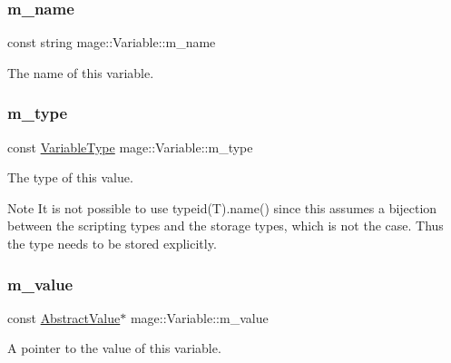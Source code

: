 \subsubsection{\texorpdfstring{m\+\_\+name}{m\_name}}
{\footnotesize\ttfamily const string mage\+::\+Variable\+::m\+\_\+name\hspace{0.3cm}{\ttfamily [private]}}

The name of this variable. \hypertarget{structmage_1_1_variable_acb45a61a0690e0efac614915595c4449}{}\label{structmage_1_1_variable_acb45a61a0690e0efac614915595c4449} 
\subsubsection{\texorpdfstring{m\+\_\+type}{m\_type}}
{\footnotesize\ttfamily const \hyperlink{namespacemage_a530428e73bac0ba7fe84b29086a9e33a}{Variable\+Type} mage\+::\+Variable\+::m\+\_\+type\hspace{0.3cm}{\ttfamily [private]}}

The type of this value.

\begin{DoxyNote}{Note}
It is not possible to use typeid(\+T).name() since this assumes a bijection between the scripting types and the storage types, which is not the case. Thus the type needs to be stored explicitly. 
\end{DoxyNote}
\hypertarget{structmage_1_1_variable_a99388f3fbccf983b8d6954fd31d0eb27}{}\label{structmage_1_1_variable_a99388f3fbccf983b8d6954fd31d0eb27} 
\subsubsection{\texorpdfstring{m\+\_\+value}{m\_value}}
{\footnotesize\ttfamily const \hyperlink{structmage_1_1_variable_1_1_abstract_value}{Abstract\+Value}$\ast$ mage\+::\+Variable\+::m\+\_\+value\hspace{0.3cm}{\ttfamily [private]}}

A pointer to the value of this variable. 